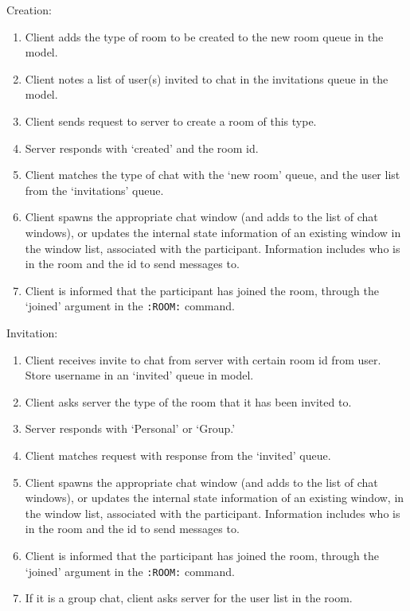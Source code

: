 Creation:
\begin{enumerate}
\item Client adds the type of room to be created to the new room queue in the model.
\item Client notes a list of user(s) invited to chat in the invitations queue in the model.
\item Client sends request to server to create a room of this type.
\item Server responds with `created' and the room id.
\item Client matches the type of chat with the `new room' queue, and the user list from the `invitations' queue.
\item Client spawns the appropriate chat window (and adds to the list of chat windows), or updates the internal state information of an existing window in the window list, associated with the participant. Information includes who is in the room and the id to send messages to.
\item Client is informed that the participant has joined the room, through the `joined' argument in the \texttt{:ROOM:} command.
\end {enumerate}

Invitation:
\begin{enumerate}
\item Client receives invite to chat from server with certain room id from user. Store username in an `invited' queue in model.  
\item Client asks server the type of the room that it has been invited to.
\item Server responds with `Personal' or `Group.'
\item Client matches request with response from the `invited' queue.
\item Client spawns the appropriate chat window (and adds to the list of chat windows), or updates the internal state information of an existing window, in the window list, associated with the participant. Information includes who is in the room and the id to send messages to.
\item Client is informed that the participant has joined the room, through the `joined' argument in the \texttt{:ROOM:} command.
\item If it is a group chat, client asks server for the user list in the room.
\end{enumerate}

